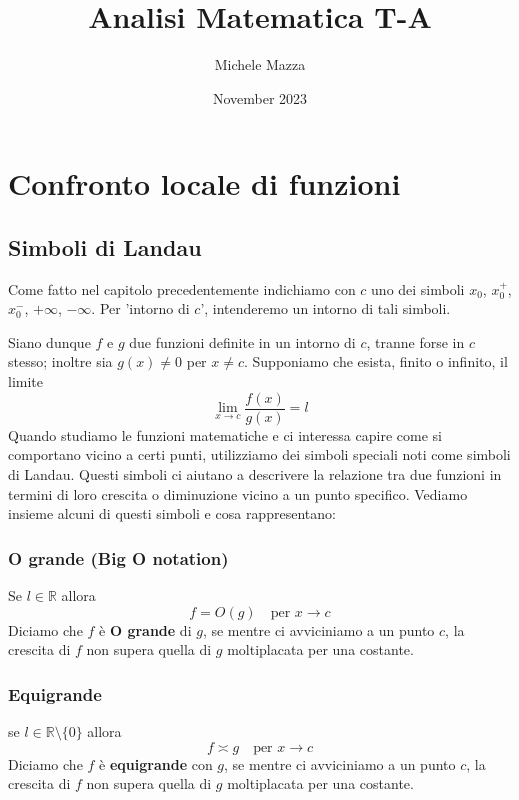 \documentclass{book}
\title{Analisi Matematica T-A}
\author{Michele Mazza}
\date{November 2023}
\begin{document}
\frontmatter
\maketitle
\tableofcontents
\mainmatter

\chapter{Confronto locale di funzioni}

\section{Simboli di Landau}
Come fatto nel capitolo precedentemente indichiamo con \(c\) uno dei simboli \(x_0\), \(x_0^+\), \(x_0^-\), \(+\infty\), \(-\infty\).
Per 'intorno di \(c\)', intenderemo un intorno di tali simboli.

Siano dunque \(f\) e \(g\) due funzioni definite in un intorno di \(c\), tranne forse in \(c\) stesso; inoltre sia \(g(x) \neq 0\) per \(x \neq c\).
Supponiamo che esista, finito o infinito, il limite
\[
  \lim_{x \to c} \frac{f(x)}{g(x)} = l
\]
Quando studiamo le funzioni matematiche e ci interessa capire come si comportano vicino a certi punti, utilizziamo dei simboli speciali noti come simboli di Landau. Questi simboli ci aiutano a descrivere la relazione tra due funzioni in termini di loro crescita o diminuzione vicino a un punto specifico. Vediamo insieme alcuni di questi simboli e cosa rappresentano:
\begin {definition}
\subsection{O grande (Big O notation)}
Se \(l \in \mathbb{R}\) allora
\[
  f = O(g) \quad \text{per } x \to c
\]
Diciamo che \(f\) è \textbf{O grande} di \(g\), se mentre ci avviciniamo a un punto \(c\), la crescita di \(f\) non supera quella di \(g\) moltiplacata per una costante.
\end{definition}

\begin{definition}
  \subsection{Equigrande}
  se \(l \in \mathbb{R} \setminus \{0\} \) allora
  \[
    f \asymp g \quad \text{per } x \to c
  \]
  Diciamo che \(f\) è \textbf{equigrande} con \(g\), se mentre ci avviciniamo a un punto \(c\), la crescita di \(f\) non supera quella di \(g\) moltiplacata per una costante.
\end{definition}
\end{document}
